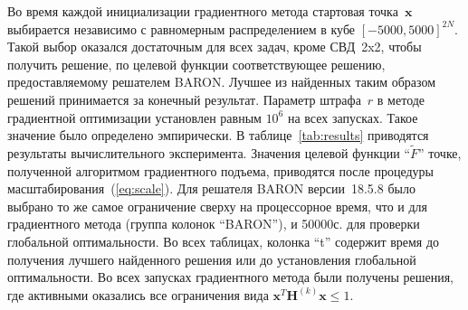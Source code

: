 Во время каждой инициализации градиентного метода стартовая точка~$\textbf{x}$ выбирается независимо с равномерным распределением в кубе $[-5000, 5000]^{2N}$. Такой выбор оказался достаточным для всех задач, кроме СВД~2x2, чтобы получить решение, по целевой функции соответствующее решению, предоставляемому решателем BARON. Лучшее из найденных таким образом решений принимается за конечный результат. Параметр штрафа~$r$ в методе градиентной оптимизации установлен равным $10^6$ на всех запусках. Такое значение было определено эмпирически. В таблице~\ref{tab:results} приводятся результаты вычислительного эксперимента. Значения целевой функции ``$\tilde{F}$'' точке, полученной алгоритмом градиентного подъема, приводятся после процедуры масштабирования~(\ref{eq:scale}). Для решателя BARON версии~18.5.8 было выбрано то же самое ограничение сверху на процессорное время, что и для градиентного метода (группа колонок ``BARON''), и 50000с. для проверки глобальной оптимальности. Во всех таблицах, колонка ``t'' содержит время до получения лучшего найденного решения или до установления глобальной оптимальности. Во всех запусках градиентного метода были получены решения, где активными оказались все ограничения вида $\textbf{x}^{T}\textbf{H}^{(k)}\textbf{x} \leq 1$.

